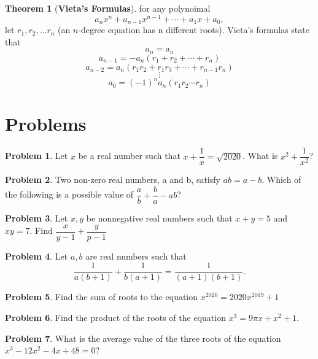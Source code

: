 \documentclass[a4paper]{article}
\theoremstyle{definition}
\newtheorem{theorem}{Theorem}
\newtheorem{problem}{Problem}
\begin{document}
\begin{theorem}[\textbf{Vieta’s Formulas}]
    for any polynoimal
    \[
        a_n x^n + a_{n-1} x^{n-1} + \cdots + a_1 x + a_0 ,
    \]
    let \(r_1, r_2, \dots r_n\) (an \(n\)-degree equation has n different roots).
    Vieta’s formulas state that
    \[
        a_n = a_n
    \]
    \[
        a_{n-1} = -a_n(r_1 + r_2 + \cdots + r_n)
    \]
    \[
        a_{n-2} = a_n(r_1r_2+r_1r_3+\cdots + r_{n-1}r_n)
    \]
    \[
        \vdots
    \]
    \[
        a_0 = (-1)^n a_n(r_1r_2\cdots r_n)
    \]
\end{theorem}

\section{Problems}

\begin{problem}
Let \(x\) be a real number such that \(x+\dfrac{1}{x} = \sqrt{2020}\).
What is \(x^2 + \dfrac{1}{x^2}\)?
\end{problem}

\begin{problem}
Two non-zero real numbers, a and b, satisfy \(ab = a - b\).
Which of the following is a possible value of \(\dfrac{a}{b}
+ \dfrac{b}{a} -ab \)?
\end{problem}

\begin{problem}
Let \(x, y\) be nonnegative real numbers such that \(x + y = 5\) and \(xy = 7\). Find
\(\dfrac{x}{y-1} +\dfrac{y}{p-1}\)
\end{problem}

\begin{problem}
Let \(a, b\) are real numbers such that
\[
    \dfrac{1}{a(b+1)} + \dfrac{1}{b(a+1)} = \dfrac{1}{(a+1)(b+1)}.
\]
\end{problem}

\begin{problem}
Find the sum of roots to the equation \(x^{2020} = 2020x^{2019} + 1\)
\end{problem}

\begin{problem}
Find the product of the roots of the equation \(x^3 = 9\pi x + x^2 + 1. \)
\end{problem}

\begin{problem}
What is the average value of the three roots of the equation \(x^3 -12x^2 - 4x + 48 = 0\)?
\end{problem}
\end{document}

